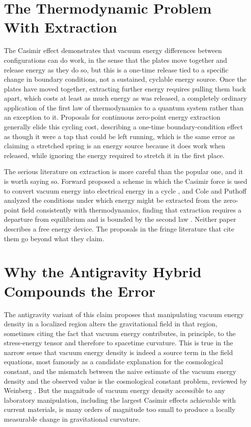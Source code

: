 \documentclass[11pt]{article}
\begin{document}
\section{The Thermodynamic Problem With Extraction}

The Casimir effect demonstrates that vacuum energy differences between configurations can do work, in the sense that the plates move together and release energy as they do so, but this is a one-time release tied to a specific change in boundary conditions, not a sustained, cyclable energy source. Once the plates have moved together, extracting further energy requires pulling them back apart, which costs at least as much energy as was released, a completely ordinary application of the first law of thermodynamics to a quantum system rather than an exception to it. Proposals for continuous zero-point energy extraction generally elide this cycling cost, describing a one-time boundary-condition effect as though it were a tap that could be left running, which is the same error as claiming a stretched spring is an energy source because it does work when released, while ignoring the energy required to stretch it in the first place.

The serious literature on extraction is more careful than the popular one, and it is worth saying so. Forward proposed a scheme in which the Casimir force is used to convert vacuum energy into electrical energy in a cycle \cite{F1984}, and Cole and Puthoff analyzed the conditions under which energy might be extracted from the zero-point field consistently with thermodynamics, finding that extraction requires a departure from equilibrium and is bounded by the second law \cite{CP1993}. Neither paper describes a free energy device. The proposals in the fringe literature that cite them go beyond what they claim.

\section{Why the Antigravity Hybrid Compounds the Error}

The antigravity variant of this claim proposes that manipulating vacuum energy density in a localized region alters the gravitational field in that region, sometimes citing the fact that vacuum energy contributes, in principle, to the stress-energy tensor and therefore to spacetime curvature. This is true in the narrow sense that vacuum energy density is indeed a source term in the field equations, most famously as a candidate explanation for the cosmological constant, and the mismatch between the naive estimate of the vacuum energy density and the observed value is the cosmological constant problem, reviewed by Weinberg \cite{W1989}. But the magnitude of vacuum energy density accessible to any laboratory manipulation, including the largest Casimir effects achievable with current materials, is many orders of magnitude too small to produce a locally measurable change in gravitational curvature.
\end{document}
